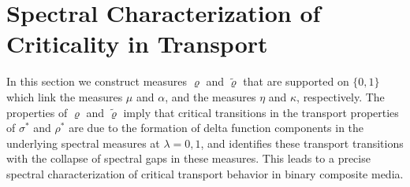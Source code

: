 \documentclass[english,12pt,jmp,graphicx]{revtex4-1}
\begin{document}
%
%
%
\section{Spectral Characterization of Criticality in
  Transport} \label{sec:Measure_Equivalences}   
%
In this section we construct measures $\varrho$ and $\tilde{\varrho}$ that are
supported on $\{0,1\}$ which link the measures $\mu$ and $\alpha$, and the
measures $\eta$ and $\kappa$, respectively. The properties of $\varrho$ and
$\tilde{\varrho}$ imply that critical transitions in the transport
properties of $\sigma^*$ and $\rho^*$ are due to the formation of delta
function components in the underlying spectral measures at
$\lambda=0,1$, and identifies these transport transitions with the collapse
of spectral gaps in these measures. This leads to a precise spectral
characterization of critical transport behavior in binary composite
media.

\end{document}

